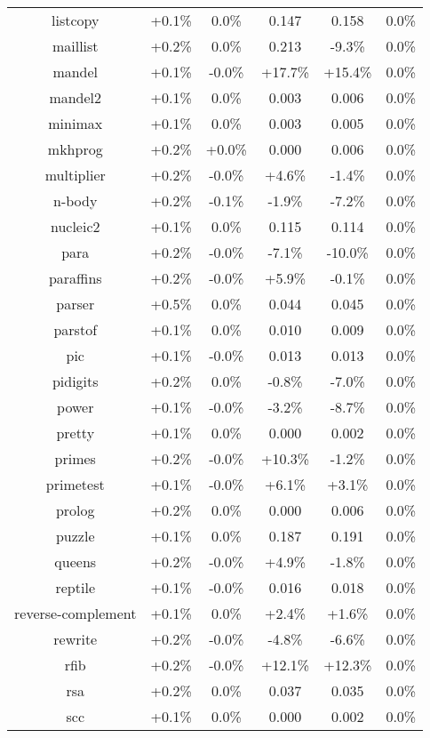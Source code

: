 \begin{tabular}{ c c c c c c }
listcopy & +0.1\% &  0.0\% & 0.147 & 0.158 &  0.0\%\\
maillist & +0.2\% &  0.0\% & 0.213 & -9.3\% &  0.0\%\\
mandel & +0.1\% & -0.0\% & +17.7\% & +15.4\% &  0.0\%\\
mandel2 & +0.1\% &  0.0\% & 0.003 & 0.006 &  0.0\%\\
minimax & +0.1\% &  0.0\% & 0.003 & 0.005 &  0.0\%\\
mkhprog & +0.2\% & +0.0\% & 0.000 & 0.006 &  0.0\%\\
multiplier & +0.2\% & -0.0\% & +4.6\% & -1.4\% &  0.0\%\\
n-body & +0.2\% & -0.1\% & -1.9\% & -7.2\% &  0.0\%\\
nucleic2 & +0.1\% &  0.0\% & 0.115 & 0.114 &  0.0\%\\
para & +0.2\% & -0.0\% & -7.1\% & -10.0\% &  0.0\%\\
paraffins & +0.2\% & -0.0\% & +5.9\% & -0.1\% &  0.0\%\\
parser & +0.5\% &  0.0\% & 0.044 & 0.045 &  0.0\%\\
parstof & +0.1\% &  0.0\% & 0.010 & 0.009 &  0.0\%\\
pic & +0.1\% & -0.0\% & 0.013 & 0.013 &  0.0\%\\
pidigits & +0.2\% &  0.0\% & -0.8\% & -7.0\% &  0.0\%\\
power & +0.1\% & -0.0\% & -3.2\% & -8.7\% &  0.0\%\\
pretty & +0.1\% &  0.0\% & 0.000 & 0.002 &  0.0\%\\
primes & +0.2\% & -0.0\% & +10.3\% & -1.2\% &  0.0\%\\
primetest & +0.1\% & -0.0\% & +6.1\% & +3.1\% &  0.0\%\\
prolog & +0.2\% &  0.0\% & 0.000 & 0.006 &  0.0\%\\
puzzle & +0.1\% &  0.0\% & 0.187 & 0.191 &  0.0\%\\
queens & +0.2\% & -0.0\% & +4.9\% & -1.8\% &  0.0\%\\
reptile & +0.1\% & -0.0\% & 0.016 & 0.018 &  0.0\%\\
reverse-complement & +0.1\% &  0.0\% & +2.4\% & +1.6\% &  0.0\%\\
rewrite & +0.2\% & -0.0\% & -4.8\% & -6.6\% &  0.0\%\\
rfib & +0.2\% & -0.0\% & +12.1\% & +12.3\% &  0.0\%\\
rsa & +0.2\% &  0.0\% & 0.037 & 0.035 &  0.0\%\\
scc & +0.1\% &  0.0\% & 0.000 & 0.002 &  0.0\%\\

\end{tabular}
